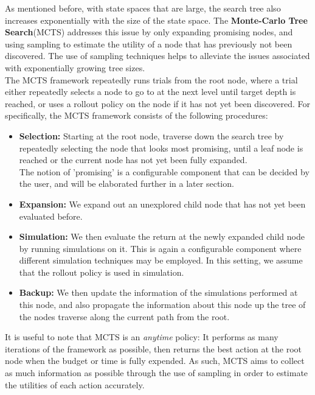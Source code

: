 \documentclass[11pt]{article}
\begin{document}
As mentioned before, with state spaces that are large, the search tree also increases exponentially with the size of the state space. The \textbf{Monte-Carlo Tree Search}(MCTS) addresses this issue by only expanding promising nodes, and using sampling to estimate the utility of a node that has previously not been discovered. The use of sampling techniques helps to alleviate the issues associated with exponentially growing tree sizes.\\

The MCTS framework repeatedly runs trials from the root node, where a trial either repeatedly selects a node to go to at the next level until target depth is reached, or uses a rollout policy on the node if it has not yet been discovered. For specifically, the MCTS framework consists of the following procedures:

\begin{itemize}
    \item \textbf{Selection:} Starting at the root node, traverse down the search tree by repeatedly selecting the node that looks most promising, until a leaf node is reached or the current node has not yet been fully expanded.\\
    
    The notion of 'promising' is a configurable component that can be decided by the user, and will be elaborated further in a later section.\\
    \item \textbf{Expansion:} We expand out an unexplored child node that has not yet been evaluated before.\\
    
    \item \textbf{Simulation:} We then evaluate the return at the newly expanded child node by running simulations on it. This is again a configurable component where different simulation techniques may be employed. In this setting, we assume that the rollout policy is used in simulation.\\
    
    \item \textbf{Backup:} We then update the information of the simulations performed at this node, and also propagate the information about this node up the tree of the nodes traverse along the current path from the root.
\end{itemize}

It is useful to note that MCTS is an \textit{anytime} policy: It performs as many iterations of the framework as possible, then returns the best action at the root node when the budget or time is fully expended. As such, MCTS aims to collect as much information as possible through the use of sampling in order to estimate the utilities of each action accurately.\\
\end{document}
